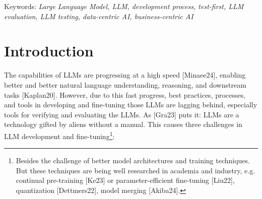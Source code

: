\documentclass[twocolumn]{article}
\begin{document}
Keywords: {\em Large Language Model, LLM, development process, test-first, LLM evaluation, LLM testing, data-centric AI, business-centric AI}

\section{Introduction}

The capabilities of LLMs are progressing at a high speed [Minaee24],
enabling better and better natural language understanding, reasoning, and downstream tasks [Kaplan20].
However, due to this fast progress, best practices, processes, and tools in developing and fine-tuning those LLMs are lagging behind,
especially tools for verifying and evaluating the LLMs.
As [Gra23] puts it: LLMs are a technology gifted by aliens without a manual.
This causes three challenges in LLM development and fine-tuning\footnote{Besides the challenge of better model architectures and training techniques. But these techniques are being well researched in academia and industry, e.g. continual pre-training [Ke23] or parameter-efficient fine-tuning [Liu22], quantization [Dettmers22], model merging [Akiba24].}:
\end{document}

